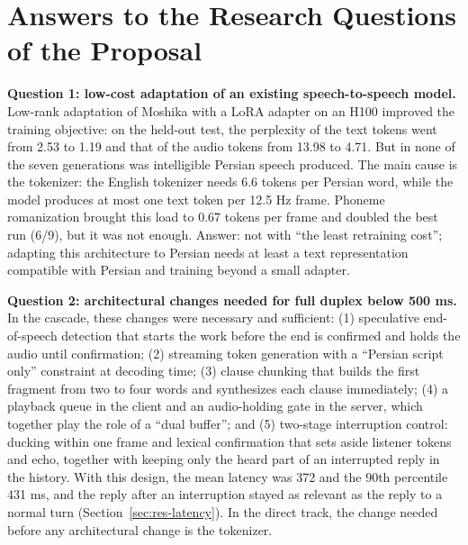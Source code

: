 \section{Answers to the Research Questions of the Proposal}
\label{sec:rq-answers}

\textbf{Question 1: low-cost adaptation of an existing speech-to-speech model.} Low-rank adaptation of
Moshika with a LoRA adapter on an H100 improved the training objective: on the held-out test, the
perplexity of the text tokens went from 2.53 to 1.19 and that of the audio tokens from 13.98 to 4.71.
But in none of the seven generations was intelligible Persian speech produced. The main cause is the
tokenizer: the English tokenizer needs 6.6 tokens per Persian word, while the model produces at most
one text token per 12.5 Hz frame. Phoneme romanization brought this load to 0.67 tokens per frame and
doubled the best run (6/9), but it was not enough. Answer: not with ``the least retraining cost'';
adapting this architecture to Persian needs at least a text representation compatible with Persian
and training beyond a small adapter.

\textbf{Question 2: architectural changes needed for full duplex below 500 ms.} In the cascade, these
changes were necessary and sufficient: (1) speculative end-of-speech detection that starts the work
before the end is confirmed and holds the audio until confirmation; (2) streaming token generation
with a ``Persian script only'' constraint at decoding time; (3) clause chunking that builds the first
fragment from two to four words and synthesizes each clause immediately; (4) a playback queue in the
client and an audio-holding gate in the server, which together play the role of a ``dual buffer'';
and (5) two-stage interruption control: ducking within one frame and lexical confirmation that sets
aside listener tokens and echo, together with keeping only the heard part of an interrupted reply in
the history. With this design, the mean latency was 372 and the 90th percentile 431 ms, and the reply
after an interruption stayed as relevant as the reply to a normal turn
(Section~\ref{sec:res-latency}). In the direct track, the change needed before any architectural
change is the tokenizer.

